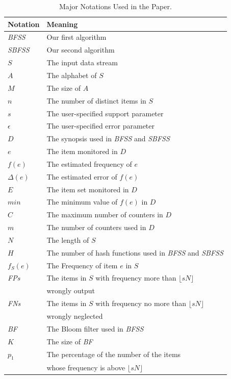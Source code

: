 \documentclass[conference]{IEEEtran}
\begin{document}
\begin{table}
	
    \caption{Major Notations Used in the Paper.}
   
	\begin{tabular}{ll}
		\hline	Notation  & Meaning\\ 
		\hline
		\emph{BFSS} & Our first algorithm\\
		\emph{SBFSS} & Our second algorithm\\	
		$S$ & The input data stream\\
		$A$ & The alphabet of $S$\\
		$M$ & The size of $A$\\
		$n$ & The number of distinct items in $S$\\
		$s$ & The user-specified support parameter\\
	    $\epsilon$ & The user-specified error parameter\\
		$D$ & The synopsis used in \emph{BFSS} and \emph{SBFSS}\\
	    $e$ & The item monitored in $D$\\
	    $f(e)$ & The estimated frequency of $e$\\
	    $\Delta(e)$& The estimated error of $f(e)$\\
		$E$ & The item set monitored in $D$\\
		$min$ & The minimum value of $f(e)$ in $D$\\
		$C$ & The maximum number of counters in $D$\\
		$m$ & The number of counters used in $D$\\
		$N$ & The length of $S$\\
		$H$ & The number of hash functions used in \emph{BFSS} and \emph{SBFSS}\\
		$f_S(e)$ & The Frequency of item $e$ in $S$\\ 
		\emph{FPs} &The items in $S$ with frequency more than $\lfloor sN\rfloor$\\& wrongly output\\
		\emph{FNs} & The items in $S$ with frequency no more than $\lfloor sN\rfloor$ \\&wrongly neglected\\
		\emph{BF}  &The Bloom filter used in \emph{BFSS}\\
		$K$ & The size of \emph{BF}\\
		$p_1$ & The percentage of the number of the items \\&whose frequency is above $\lfloor sN\rfloor$\\

\end{tabular}
\end{table}
\end{document}

